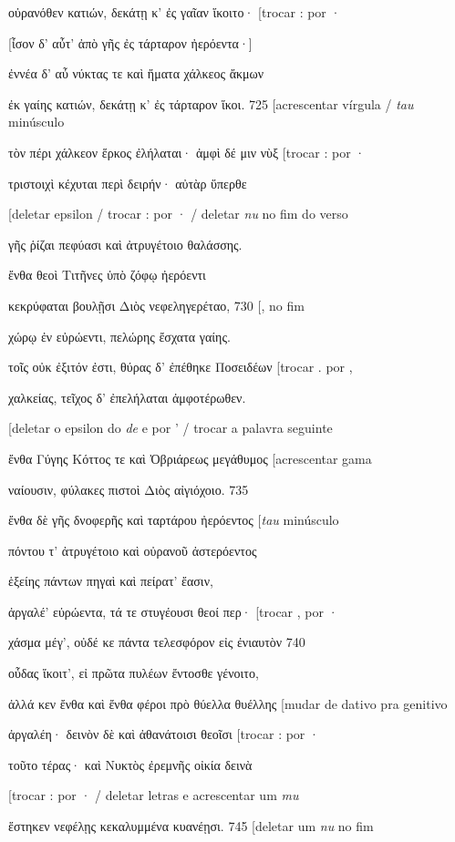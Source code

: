 οὐρανόθεν κατιών, δεκάτῃ κ' ἐς γαῖαν ἵκοιτο· {[}trocar : por ·

{[}ἶσον δ' αὖτ' ἀπὸ γῆς ἐς τάρταρον ἠερόεντα·{]}

ἐννέα δ' αὖ νύκτας τε καὶ ἤματα χάλκεος ἄκμων

ἐκ γαίης κατιών, δεκάτῃ κ' ἐς τάρταρον ἵκοι. 725 {[}acrescentar vírgula
/ \emph{tau} minúsculo

τὸν πέρι χάλκεον ἕρκος ἐλήλαται· ἀμφὶ δέ μιν νὺξ {[}trocar : por ·

τριστοιχὶ κέχυται περὶ δειρήν· αὐτὰρ ὕπερθε

{[}deletar epsilon / trocar : por · / deletar \emph{nu} no fim do verso

γῆς ῥίζαι πεφύασι καὶ ἀτρυγέτοιο θαλάσσης.

ἔνθα θεοὶ Τιτῆνες ὑπὸ ζόφῳ ἠερόεντι

κεκρύφαται βουλῇσι Διὸς νεφεληγερέταο, 730 {[}, no fim

χώρῳ ἐν εὐρώεντι, πελώρης ἔσχατα γαίης.

τοῖς οὐκ ἐξιτόν ἐστι, θύρας δ' ἐπέθηκε Ποσειδέων {[}trocar . por ,

χαλκείας, τεῖχος δ' ἐπελήλαται ἀμφοτέρωθεν.

{[}deletar o epsilon do \emph{de} e por ' / trocar a palavra seguinte

ἔνθα Γύγης Κόττος τε καὶ Ὀβριάρεως μεγάθυμος {[}acrescentar gama

ναίουσιν, φύλακες πιστοὶ Διὸς αἰγιόχοιο. 735

ἔνθα δὲ γῆς δνοφερῆς καὶ ταρτάρου ἠερόεντος {[}\emph{tau} minúsculo

πόντου τ' ἀτρυγέτοιο καὶ οὐρανοῦ ἀστερόεντος

ἑξείης πάντων πηγαὶ καὶ πείρατ' ἔασιν,

ἀργαλέ' εὐρώεντα, τά τε στυγέουσι θεοί περ· {[}trocar , por ·

χάσμα μέγ', οὐδέ κε πάντα τελεσφόρον εἰς ἐνιαυτὸν 740

οὖδας ἵκοιτ', εἰ πρῶτα πυλέων ἔντοσθε γένοιτο,

ἀλλά κεν ἔνθα καὶ ἔνθα φέροι πρὸ θύελλα θυέλλης {[}mudar de dativo pra
genitivo

ἀργαλέη· δεινὸν δὲ καὶ ἀθανάτοισι θεοῖσι {[}trocar : por ·

τοῦτο τέρας· καὶ Νυκτὸς ἐρεμνῆς οἰκία δεινὰ

{[}trocar : por · / deletar letras e acrescentar um \emph{mu}

ἕστηκεν νεφέλῃς κεκαλυμμένα κυανέῃσι. 745 {[}deletar um \emph{nu} no fim

